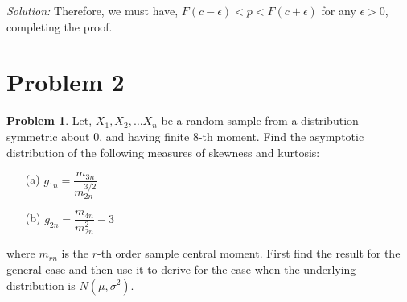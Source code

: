 \documentclass[12pt]{article}
\theoremstyle{definition}
\newtheorem*{prb}{Problem}
\newenvironment{problem}{
\begin{tcolorbox}[colback=blue!5!white,colframe=blue!75!black, parbox = true] \begin{prb}  }{\end{prb}\end{tcolorbox} }
\newenvironment{answer}{\textit{Solution: }\quad }{ \hfill \qedsymbol}
\begin{document}
\begin{answer}
	Therefore, we must have, $F(c -\epsilon) < p < F(c+ \epsilon)$ for any $\epsilon > 0$, completing the proof.

\end{answer}


\section{Problem 2}

\begin{problem}
	Let, $X_1, X_2, \dots X_n$ be a random sample from a distribution symmetric about $0$, and having finite $8$-th moment. Find the asymptotic distribution of the following measures of skewness and kurtosis:

	\begin{enumerate}
		\item[(a)] $g_{1n} = \dfrac{m_{3n}}{m_{2n}^{3/2}}$
		\item[(b)] $g_{2n} = \dfrac{m_{4n}}{m_{2n}^2} - 3$ 
	\end{enumerate}

	where $m_{rn}$ is the $r$-th order sample central moment. First find the result for the general case and then use it to derive for the case when the underlying distribution is $N(\mu, \sigma^2)$. 
\end{problem}
\end{document}
